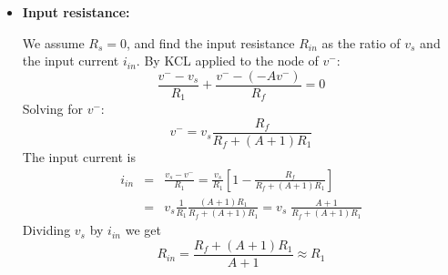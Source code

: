 \begin{itemize}
\begin{itemize}
   \item {\bf Input resistance:} 

      We assume $R_s=0$, and find the input resistance $R_{in}$ as the
      ratio of $v_s$ and the input current $i_{in}$. By KCL applied to 
      the node of $v^-$:
      \[
      \frac{v^--v_s}{R_1}+\frac{v^--(-Av^-)}{R_f}=0 
      \]
      Solving for $v^-$:
      \[
      v^-=v_s\frac{R_f}{R_f+(A+1)R_1} 
      \]
      The input current is
      \begin{eqnarray}
	i_{in}&=&\frac{v_s-v^-}{R_1}
        =\frac{v_s}{R_1}\left[1-\frac{R_f}{R_f+(A+1)R_1}\right]
	\nonumber \\
	&=&v_s\frac{1}{R_1}\frac{(A+1)R_1}{R_f+(A+1) R_1}
        =v_s\;\frac{A+1}{R_f+(A+1) R_1}
	\nonumber \end{eqnarray}
      Dividing $v_s$ by $i_{in}$ we get
      \[
      R_{in}=\frac{R_f+(A+1) R_1}{A+1}\approx R_1
      \]
      
    \begin{comment}
    \item {\bf Input resistance:} 

      We assume $R_s=0$, and find the input resistance $R_{in}$ as the
      ratio of $v_s$ and the input current $i_{in}$. By KCL applied to 
      the node of $v^-$:
      \[
      \frac{v^--v_s}{R_1}+\frac{v^-}{r_{in}}+\frac{v^--(-Av^-)}{R_f+r_{out}}=0 
      \]
      Solving for $v^-$:
      \[
      v^-=v_s\frac{r_{in}(R_f+r_{out})}{(R_1+r_{in})(R_f+r_{out})+(A+1)R_1r_{in}} 
      \]
      The input current is
      \begin{eqnarray}
	i_{in}&=&\frac{v_s-v^-}{R_1}
        =\frac{v_s}{R_1}\left[1-\frac{r_{in}(R_f+r_{out})}{(R_1+r_{in})(R_f+r_{out})
            +(A+1)R_1r_{in}}\right] 
	\nonumber \\
	&=&v_s\frac{R_f+r_{out}+(A+1)r_{in}}{(R_1+r_{in})(R_f+r_{out})+(A+1)R_1r_{in}} 
	\nonumber \end{eqnarray}
      Dividing $v_s$ by $i_{in}$ we get
      \begin{eqnarray}
      R_{in}&=&\frac{v_s}{i_{in}}
      =\frac{[R_f+r_{out}+(A+1)R_1]r_{in}+R_1(R_f+r_{out})}{R_f+r_{out}+(A+1)r_{in}} 
      \nonumber\\
      &\approx&\frac{(R_f+A\,R_1)r_{in}+R_1R_f}{R_f+A\,r_{in}} 
      \approx \frac{A\,R_1\,r_{in}}{A\,r_{in}}=R_1 
      \nonumber
      \end{eqnarray}
      The first approximation is based on $r_{out}\ll R_1,\,R_f$ and $A\gg 1$,
      the second approximation is based on $A\,r_{in}\gg R_1,\,R_f$.
    \end{comment}


\end{itemize}
\end{itemize}
